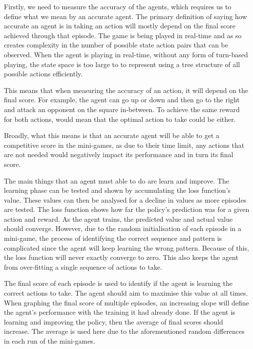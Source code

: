 Firstly, we need to measure the accuracy of the agents, which requires us to
define what we mean by an accurate agent. The primary definition of saying how
accurate an agent is in taking an action will mostly depend on the final score
achieved through that episode. The game is being played in real-time and as so
creates complexity in the number of possible state action pairs that can be
observed. When the agent is playing in real-time, without any form of turn-based
playing, the state space is too large to to represent using a tree structure of
all possible actions efficiently.

This means that when measuring the accuracy of an action, it will depend on the
final score. For example, the agent can go up or down and then go to the right
and attack an opponent on the square in-between. To achieve the same reward for
both actions, would mean that the optimal action to take could be either.

Broadly, what this means is that an accurate agent will be able to get a
competitive score in the mini-games, as due to their time limit, any actions
that are not needed would negatively impact its performance and in turn its
final score.

The main things that an agent must able to do are learn and improve. The learning
phase can be tested and shown by accumulating the loss function's value. These
values can then be analysed for a decline in values as more episodes are tested.
The loss function shows how far the policy's prediction was for a given action
and reward. As the agent trains, the predicted value and actual value should
converge. However, due to the random initialisation of each episode in a
mini-game, the process of identifying the correct sequence and pattern is
complicated since the agent will keep learning the wrong pattern. Because of this,
the loss function will never exactly converge to zero. This also keeps the
agent from over-fitting a single sequence of actions to take.

The final score of each episode is used to identify if the agent is learning the
correct actions to take. The agent should aim to maximise this value at all
times. When graphing the final score of multiple episodes, an increasing slope
will define the agent's performance with the training it had already done. If the
agent is learning and improving the policy, then the average of final scores
should increase. The average is used here due to the aforementioned random
differences in each run of the mini-games.

